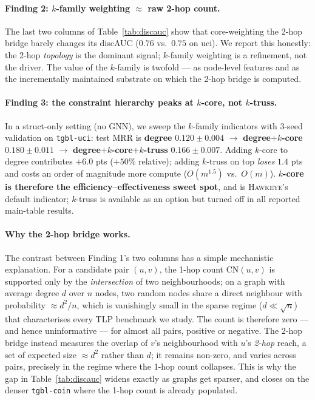 \documentclass[sigconf,nonacm,review]{acmart}
\newcommand{\method}{\textsc{Hawkeye}\xspace}
\begin{document}
\paragraph{Finding 2: $k$-family weighting $\approx$ raw 2-hop count.}
The last two columns of Table~\ref{tab:discauc} show that core-weighting the
2-hop bridge barely changes its discAUC ($0.76$ vs.\ $0.75$ on uci). We report
this honestly: the 2-hop \emph{topology} is the dominant signal; $k$-family
weighting is a refinement, not the driver. The value of the $k$-family is
twofold --- as node-level features and as the incrementally maintained
substrate on which the 2-hop bridge is computed.

\paragraph{Finding 3: the constraint hierarchy peaks at $k$-core, not $k$-truss.}
In a struct-only setting (no GNN), we sweep the $k$-family indicators
with 3-seed validation on \texttt{tgbl-uci}: test MRR is
\textbf{degree} $0.120\!\pm\!0.004$ $\to$ \textbf{degree$+k$-core}
$0.180\!\pm\!0.011$ $\to$ \textbf{degree$+k$-core$+k$-truss}
$0.166\!\pm\!0.007$. Adding $k$-core to degree contributes $+6.0$ pts
($+50\%$ relative); adding $k$-truss on top \emph{loses} $1.4$ pts and
costs an order of magnitude more compute ($O(m^{1.5})$ vs.\ $O(m)$).
\textbf{$k$-core is therefore the efficiency--effectiveness sweet spot},
and is \method's default indicator; $k$-truss is available as an option
but turned off in all reported main-table results.

\paragraph{Why the 2-hop bridge works.}
The contrast between Finding 1's two columns has a simple mechanistic explanation. For
a candidate pair $(u,v)$, the 1-hop count $\mathrm{CN}(u,v)$ is supported only
by the \emph{intersection} of two neighbourhoods; on a graph with average
degree $d$ over $n$ nodes, two random nodes share a direct neighbour with
probability $\approx d^2/n$, which is vanishingly small in the sparse regime
($d\ll\sqrt{n}$) that characterises every TLP benchmark we study. The count is
therefore zero --- and hence uninformative --- for almost all pairs, positive
or negative. The 2-hop bridge instead measures the overlap of $v$'s
neighbourhood with $u$'s \emph{2-hop} reach, a set of expected size
$\approx d^2$ rather than $d$; it remains non-zero, and varies across pairs,
precisely in the regime where the 1-hop count collapses. This is why the gap in
Table~\ref{tab:discauc} widens exactly as graphs get sparser, and closes on the
denser \texttt{tgbl-coin} where the 1-hop count is already populated.
\end{document}
